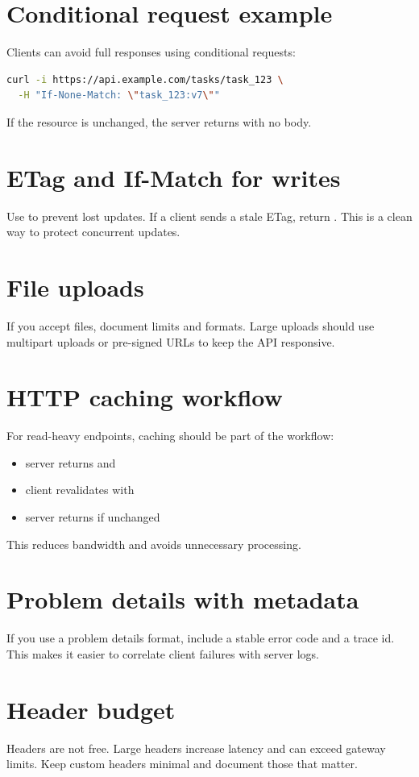 \section{Conditional request example}
Clients can avoid full responses using conditional requests:
\begin{lstlisting}[language=Bash]
curl -i https://api.example.com/tasks/task_123 \
  -H "If-None-Match: \"task_123:v7\""
\end{lstlisting}

If the resource is unchanged, the server returns  with no body.

\section{ETag and If-Match for writes}
Use  to prevent lost updates.
If a client sends a stale ETag, return .
This is a clean way to protect concurrent updates.

\section{File uploads}
If you accept files, document limits and formats.
Large uploads should use multipart uploads or pre-signed URLs to keep the API responsive.

\section{HTTP caching workflow}
For read-heavy endpoints, caching should be part of the workflow:
\begin{itemize}[nosep]
  \item server returns  and 
  \item client revalidates with 
  \item server returns  if unchanged
\end{itemize}

This reduces bandwidth and avoids unnecessary processing.

\section{Problem details with metadata}
If you use a problem details format, include a stable error code and a trace id.
This makes it easier to correlate client failures with server logs.

\section{Header budget}
Headers are not free.
Large headers increase latency and can exceed gateway limits.
Keep custom headers minimal and document those that matter.

